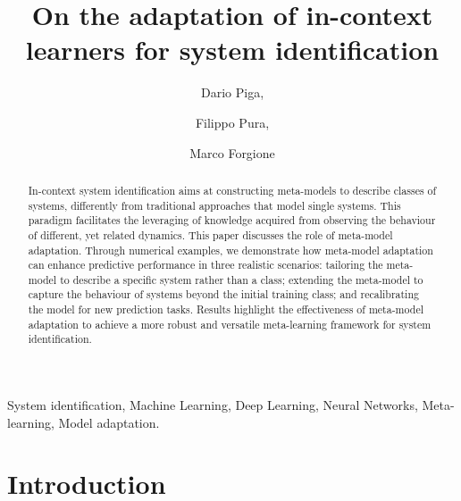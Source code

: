 \documentclass{ifacconf}
\begin{document}
\begin{frontmatter}

\title{On the adaptation of in-context learners for system identification} 





 \author{Dario Piga,}
\author{Filippo Pura,} 
\author{Marco Forgione}


\address{IDSIA Dalle Molle Institute for Artificial Intelligence USI-SUPSI, Via la Santa 1, CH-6962 Lugano-Viganello, Switzerland.}

\begin{abstract}                %
In-context  system identification  aims at constructing meta-models to describe classes of systems, differently from traditional approaches that model  single systems. This paradigm facilitates the leveraging of knowledge acquired from observing the behaviour of different, yet related dynamics. This paper discusses  the role of meta-model adaptation. Through numerical examples, we demonstrate how meta-model adaptation can enhance predictive performance in three realistic scenarios: tailoring the meta-model to describe a specific system rather than a class; extending the meta-model to capture the behaviour of systems beyond the initial training class; and recalibrating the model for new prediction tasks. Results highlight the effectiveness of meta-model adaptation to achieve a more robust and versatile meta-learning framework for system identification.
\end{abstract}

\begin{keyword}
System identification, Machine Learning, Deep Learning, Neural Networks, Meta-learning, Model adaptation.
\end{keyword}

\end{frontmatter}

\section{Introduction}
\end{document}
